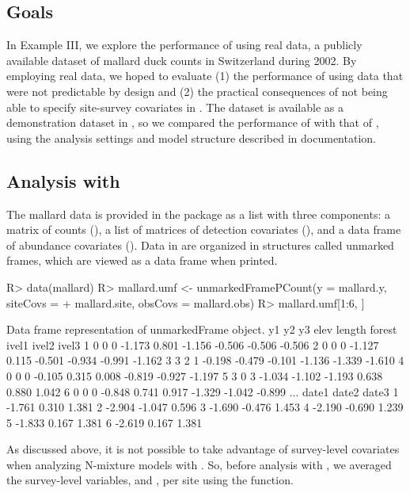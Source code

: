 \documentclass[codesnippet]{jss}
\begin{document}
\subsection[Goals]{Goals}
In Example III, we explore the performance of  using real data, a publicly available dataset of mallard duck counts in Switzerland during 2002. By employing real data, we hoped to evaluate (1) the performance of  using data that were not predictable by design and (2) the practical consequences of not being able to specify site-survey covariates in . The dataset is available as a demonstration dataset in , so we compared the performance of  with that of , using the analysis settings and model structure described in  documentation.

\subsection[Analysis with R-INLA]{Analysis with }
The mallard data is provided in the  package as a list with three components: a matrix of counts (), a list of matrices of detection covariates (), and a data frame of abundance covariates (). Data in  are organized in structures called unmarked frames, which are viewed as a data frame when printed.

\begin{CodeInput}
R> data(mallard)
R> mallard.umf <- unmarkedFramePCount(y = mallard.y, siteCovs = 
+    mallard.site, obsCovs = mallard.obs)
R> mallard.umf[1:6, ]
\end{CodeInput}
\begin{CodeOutput}
Data frame representation of unmarkedFrame object.
   y1   y2   y3    elev length forest  ivel1  ivel2  ivel3  
1   0    0    0  -1.173  0.801 -1.156 -0.506 -0.506 -0.506 
2   0    0    0  -1.127  0.115 -0.501 -0.934 -0.991 -1.162 
3   3    2    1  -0.198 -0.479 -0.101 -1.136 -1.339 -1.610 
4   0    0    0  -0.105  0.315  0.008 -0.819 -0.927 -1.197 
5   3    0    3  -1.034 -1.102 -1.193  0.638  0.880  1.042 
6   0    0    0  -0.848  0.741  0.917 -1.329 -1.042 -0.899 
...
    date1  date2  date3
1  -1.761  0.310  1.381
2  -2.904 -1.047  0.596
3  -1.690 -0.476  1.453
4  -2.190 -0.690  1.239
5  -1.833  0.167  1.381
6  -2.619  0.167  1.381
\end{CodeOutput}

As discussed above, it is not possible to take advantage of survey-level covariates when analyzing N-mixture models with .  So, before analysis with , we averaged the survey-level variables,  and , per site using the  function.
\end{document}
